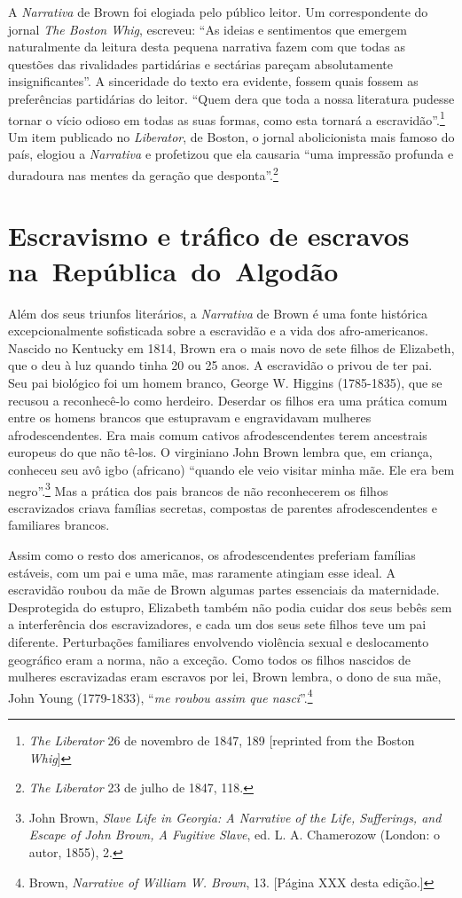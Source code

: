 A \emph{Narrativa} de Brown foi elogiada pelo público leitor. Um
correspondente do jornal \emph{The Boston Whig}, escreveu: ``As ideias e
sentimentos que emergem naturalmente da leitura desta pequena narrativa
fazem com que todas as questões das rivalidades partidárias e sectárias
pareçam absolutamente insignificantes''. A sinceridade do texto era
evidente, fossem quais fossem as preferências partidárias do leitor.
``Quem dera que toda a nossa literatura pudesse tornar o vício odioso em
todas as suas formas, como esta tornará a escravidão''.\footnote{\emph{The
  Liberator} 26 de novembro de 1847, 189 {[}reprinted from the Boston
  \emph{Whig}{]}} Um item publicado no \emph{Liberator}, de Boston, o
jornal abolicionista mais famoso do país, elogiou a \emph{Narrativa} e
profetizou que ela causaria ``uma impressão profunda e duradoura nas
mentes da geração que desponta''.\footnote{\emph{The Liberator} 23 de
  julho de 1847, 118.}

\section{Escravismo e tráfico de escravos na~República~do~Algodão}

Além dos seus triunfos literários, a \emph{Narrativa} de Brown é uma
fonte histórica excepcionalmente sofisticada sobre a escravidão e a vida
dos afro-americanos. Nascido no Kentucky em 1814, Brown era o mais novo
de sete filhos de Elizabeth, que o deu à luz quando tinha 20 ou 25 anos.
A escravidão o privou de ter pai. Seu pai biológico foi um homem branco,
George W. Higgins (1785-1835), que se recusou a reconhecê-lo como
herdeiro. Deserdar os filhos era uma prática comum entre os homens
brancos que estupravam e engravidavam mulheres afrodescendentes. Era
mais comum cativos afrodescendentes terem ancestrais europeus do que não
tê-los. O virginiano John Brown lembra que, em criança, conheceu seu avô
igbo (africano) ``quando ele veio visitar minha mãe. Ele era bem
negro''.\footnote{John Brown, \emph{Slave Life in Georgia: A Narrative
  of the Life, Sufferings, and Escape of John Brown, A Fugitive Slave},
  ed. L. A. Chamerozow (London: o autor, 1855), 2.} Mas a prática dos
pais brancos de não reconhecerem os filhos escravizados criava famílias
secretas, compostas de parentes afrodescendentes e familiares brancos.

Assim como o resto dos americanos, os afrodescendentes preferiam
famílias estáveis, com um pai e uma mãe, mas raramente atingiam esse
ideal. A escravidão roubou da mãe de Brown algumas partes essenciais da
maternidade. Desprotegida do estupro, Elizabeth também não podia cuidar
dos seus bebês sem a interferência dos escravizadores, e cada um dos
seus sete filhos teve um pai diferente. Perturbações familiares
envolvendo violência sexual e deslocamento geográfico eram a norma, não
a exceção. Como todos os filhos nascidos de mulheres escravizadas eram
escravos por lei, Brown lembra, o dono de sua mãe, John Young
(1779-1833), ``\emph{me roubou assim que nasci}''.\footnote{Brown,
  \emph{Narrative of William W. Brown}, 13. {[}Página XXX desta
  edição.{]}}

